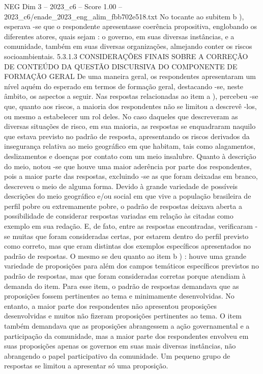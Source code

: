 \begin{textsample}{NEG Dim 3 – 2023\_c6 – Score 1.00 – 2023\_c6/enade\_2023\_eng\_alim\_fbb702e518.txt}
No tocante ao subitem b ), esperava -se que o respondente apresentasse coerência propositiva, englobando os diferentes atores, quais sejam : o governo, em suas diversas instâncias, e a comunidade, também em suas diversas organizações, almejando conter os riscos socioambientais. 5.3.1.3 CONSIDERAÇÕES FINAIS SOBRE A CORREÇÃO DE CONTEÚDO DA QUESTÃO DISCURSIVA DO COMPONENTE DE FORMAÇÃO GERAL De uma maneira geral, os respondentes apresentaram um nível aquém do esperado em termos de formação geral, destacando -se, neste âmbito, os aspectos a seguir.
Nas respostas relacionadas ao item a ), percebeu -se que, quanto aos riscos, a maioria dos respondentes não se limitou a descrevê -los, ou mesmo a estabelecer um rol deles.
No caso daqueles que descreveram as diversas situações de risco, em sua maioria, as respostas se enquadraram naquilo que estava previsto no padrão de resposta, apresentando os riscos derivados da insegurança relativa ao meio geográfico em que habitam, tais como alagamentos, deslizamentos e doenças por contato com um meio insalubre.
Quanto à descrição do meio, notou -se que houve uma maior aderência por parte dos respondentes, pois a maior parte das respostas, excluindo -se as que foram deixadas em branco, descreveu o meio de alguma forma.
Devido à grande variedade de possíveis descrições do meio geográfico e/ou social em que vive a população brasileira de perfil pobre ou extremamente pobre, o padrão de respostas deixava aberta a possibilidade de considerar respostas variadas em relação às citadas como exemplo em sua redação.
E, de fato, entre as respostas encontradas, verificaram -se muitas que foram consideradas certas, por estarem dentro do perfil previsto como correto, mas que eram distintas dos exemplos específicos apresentados no padrão de respostas.
O mesmo se deu quanto ao item b ) : houve uma grande variedade de proposições para além dos campos temáticos específicos previstos no padrão de respostas, mas que foram consideradas corretas porque atendiam à demanda do item.
Para esse item, o padrão de respostas demandava que as proposições fossem pertinentes ao tema e minimamente desenvolvidas.
No entanto, a maior parte dos respondentes não apresentou proposições desenvolvidas e muitos não fizeram proposições pertinentes ao tema.
O item também demandava que as proposições abrangessem a ação governamental e a participação da comunidade, mas a maior parte dos respondentes envolveu em suas proposições apenas os governos em suas mais diversas instâncias, não abrangendo o papel participativo da comunidade.
Um pequeno grupo de respostas se limitou a apresentar só uma proposição.

\end{textsample}
